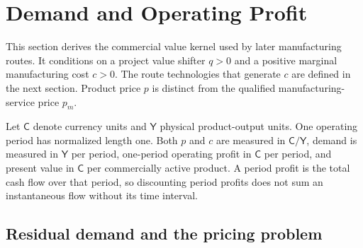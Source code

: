 \section{Demand and Operating Profit}
\label{sec:p02-demand-profit}

This section derives the commercial value kernel used by later manufacturing
routes. It conditions on a project value shifter \(q>0\) and a positive
marginal manufacturing cost \(c>0\). The route technologies that generate
\(c\) are defined in the next section. Product price \(p\) is distinct
from the qualified manufacturing-service price \(p_m\).

Let \(\mathsf C\) denote currency units and \(\mathsf Y\) physical
product-output units. One operating period has normalized length one.
Both \(p\) and \(c\) are measured in \(\mathsf C/\mathsf Y\), demand is
measured in \(\mathsf Y\) per period, one-period operating profit in
\(\mathsf C\) per period, and present value in \(\mathsf C\) per commercially
active product. A period profit is the total cash flow over that period,
so discounting period profits does not sum an instantaneous flow without
its time interval.

\subsection{Residual demand and the pricing problem}
\label{subsec:p02-demand-pricing}

